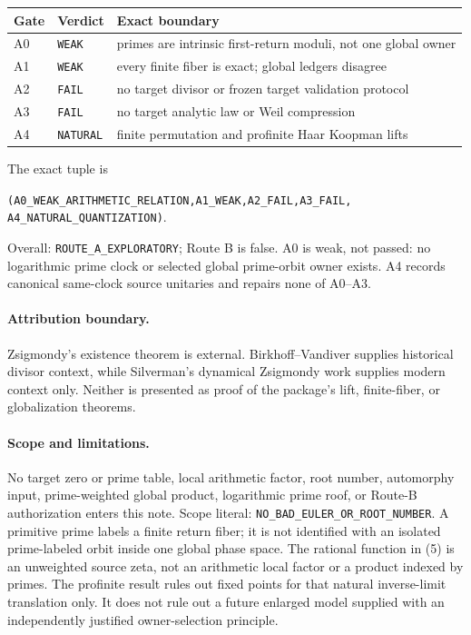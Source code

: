 \documentclass[10pt]{article}
\begin{document}
\begin{center}\small
\begin{tabular}{lll}
\toprule
Gate&Verdict&Exact boundary\\
\midrule
A0&\texttt{WEAK}&primes are intrinsic first-return moduli, not one global owner\\
A1&\texttt{WEAK}&every finite fiber is exact; global ledgers disagree\\
A2&\texttt{FAIL}&no target divisor or frozen target validation protocol\\
A3&\texttt{FAIL}&no target analytic law or Weil compression\\
A4&\texttt{NATURAL}&finite permutation and profinite Haar Koopman lifts\\
\bottomrule
\end{tabular}
\end{center}
The exact tuple is
\begin{center}\small
\texttt{(A0\_WEAK\_ARITHMETIC\_RELATION,A1\_WEAK,A2\_FAIL,A3\_FAIL,}\linebreak
\texttt{A4\_NATURAL\_QUANTIZATION)}.
\end{center}
Overall: \texttt{ROUTE\_A\_EXPLORATORY}; Route B is false.  A0 is weak,
not passed: no logarithmic prime clock or selected global prime-orbit owner
exists.  A4 records canonical same-clock source unitaries and repairs none
of A0--A3.

\paragraph{Attribution boundary.}
Zsigmondy's existence theorem is external.  Birkhoff--Vandiver
\cite{BirkhoffVandiver1904} supplies historical divisor context, while
Silverman's dynamical Zsigmondy work \cite{Silverman2013} supplies modern
context only.  Neither is presented as proof of the package's lift,
finite-fiber, or globalization theorems.

\paragraph{Scope and limitations.}
No target zero or prime table, local arithmetic factor, root number,
automorphy input, prime-weighted global product, logarithmic prime roof, or
Route-B authorization enters this note.  Scope literal:
\texttt{NO\_BAD\_EULER\_OR\_ROOT\_NUMBER}.  A primitive prime labels a
finite return fiber; it is not identified with an isolated prime-labeled
orbit inside one global phase space.  The rational function in (5) is an
unweighted source zeta, not an arithmetic local factor or a product indexed
by primes.  The profinite result rules out fixed points for that natural
inverse-limit translation only.  It does not rule out a future enlarged
model supplied with an independently justified owner-selection principle.
\end{document}
